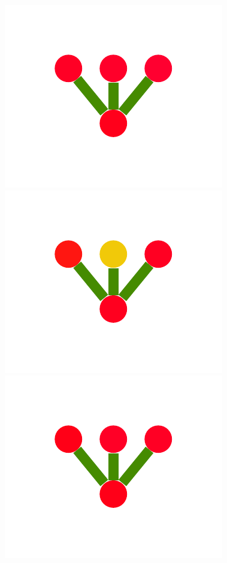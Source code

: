 \documentclass[a4paper,10pt]{article}
\begin{document}
\begin{figure}
{    \includegraphics[scale=.26]{../figures/vector/4-2-2-mergeprog-bad-0.pdf}
    \includegraphics[scale=.26]{../figures/vector/4-2-2-mergeprog-bad-1.pdf}
    \includegraphics[scale=.26]{../figures/vector/4-2-2-mergeprog-bad-2.pdf}
}
\end{figure}
\end{document}
